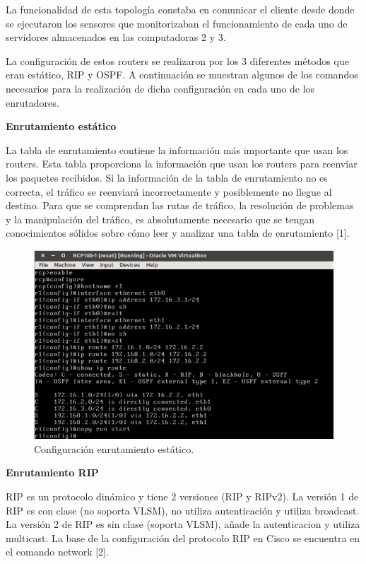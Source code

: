 La funcionalidad de esta topología constaba en comunicar el cliente desde donde se ejecutaron los sensores que monitorizaban el funcionamiento de cada uno de servidores almacenados en las computadoras 2 y 3.
\\ \par
La configuración de estos routers se realizaron por los 3 diferentes métodos que eran estático, RIP y OSPF. A continuación se muestran algunos de los comandos necesarios para la realización de dicha configuración en cada uno de los enrutadores.
\\ \par
\textbf{Enrutamiento estático}
\\ \par
La tabla de enrutamiento contiene la información más importante que usan los routers. Esta tabla
proporciona la información que usan los routers para reenviar los paquetes recibidos. Si la
información de la tabla de enrutamiento no es correcta, el tráfico se reenviará incorrectamente y posiblemente no llegue al destino. Para que se comprendan las rutas de tráfico, la resolución de
problemas y la manipulación del tráfico, es absolutamente necesario que se tengan conocimientos
sólidos sobre cómo leer y analizar una tabla de enrutamiento [1]. 
\FloatBarrier
\begin{figure}[htbp!]
		\centering
			\includegraphics[width=.7 \textwidth]{images/estatico}
		\caption{Configuración enrutamiento estático.}
		\label{image:estatico}
\end{figure}
\FloatBarrier
\textbf{Enrutamiento RIP}
\\ \par
RIP es un protocolo dinámico y tiene 2 versiones (RIP y RIPv2). La versión 1 de RIP es con clase (no soporta VLSM), no utiliza autenticación y utiliza broadcast. La versión 2 de RIP es sin clase (soporta VLSM), añade la autenticacion y utiliza multicast.
La base de la configuración del protocolo RIP en Cisco se encuentra en el comando network  [2].
